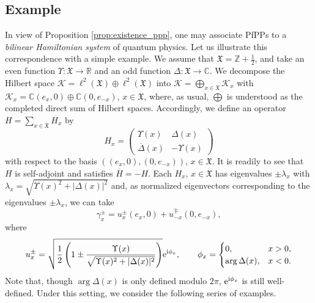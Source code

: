\documentclass[pdftex]{sigma}
\numberwithin{equation}{section}
\newcommand{\mfrak}[1]{\mathfrak{#1}}
\newcommand{\mcal}[1]{\mathcal{#1}}
\newcommand{\mbb}[1]{\mathbb{#1}}
\begin{document}
\subsection{Example}
In view of Proposition \ref{prop:existence_ppp}, one may associate PfPPs to a {\it bilinear Hamiltonian system} of quantum physics.
Let us illustrate this correspondence with a simple example.
We assume that $\mfrak{X}=\mbb{Z}+\frac{1}{2}$, and take an even function $\Upsilon\colon \mfrak{X}\to\mbb{R}$ and an odd function $\Delta\colon \mfrak{X}\to \mbb{C}$.
We decompose the Hilbert space $\mcal{K}=\ell^{2}(\mfrak{X})\oplus\ell^{2}(\mfrak{X})$ into $\mcal{K}=\bigoplus_{x\in\mfrak{X}}\mcal{K}_{x}$ with
$\mcal{K}_{x}=\mbb{C}(e_{x},0)\oplus\mbb{C}(0,e_{-x})$, $x\in\mfrak{X}$, where, as usual, $\bigoplus$ is understood as the completed direct sum of Hilbert spaces.
Accordingly, we define an operator $H=\sum_{x\in\mfrak{X}}H_{x}$ by
\begin{equation*}
	H_{x}=\left(
	\begin{matrix}
	\Upsilon (x) & \Delta (x) \\
	\overline{\Delta}(x) & -\Upsilon (x)
	\end{matrix}
	\right)
\end{equation*}
with respect to the basis $ ((e_{x},0), (0,e_{-x}) )$, $x\in\mfrak{X}$.
It is readily to see that $H$ is self-adjoint and satisfies $\overline{H}=-H$.
Each $H_{x}$, $x\in\mfrak{X}$ has eigenvalues $\pm\lambda_{x}$ with $\lambda_{x}=\sqrt{\Upsilon (x)^{2}+|\Delta (x)|^{2}}$ and, as normalized eigenvectors corresponding to the eigenvalues $\pm\lambda_{x}$, we can take
\begin{equation*}
	\gamma^{\pm}_{x}=u^{\pm}_{x}(e_{x},0)+\overline{u^{\mp}_{-x}}(0,e_{-x}),
\end{equation*}
where
\begin{gather}\label{eq:example_wavefunction}
	u^{\pm}_{x} =\sqrt{\frac{1}{2}\left(1\pm \frac{\Upsilon(x)}{\sqrt{\Upsilon (x)^{2}+|\Delta (x)|^{2}}}\right)}{\rm e}^{{\rm i}\phi_{x}}, \qquad
	\phi_{x} =
	\begin{cases}
	0, &x>0, \\
	\arg \Delta (x), &x<0.
	\end{cases}
\end{gather}
Note that, though $\arg \Delta (x)$ is only defined modulo $2\pi$, ${\rm e}^{{\rm i}\phi_{x}}$ is still well-defined.
Under this setting, we consider the following series of examples.
\end{document}
